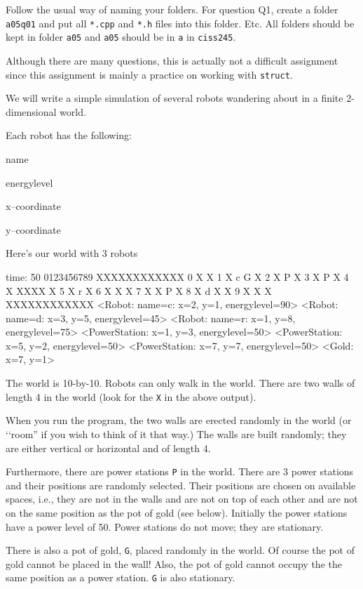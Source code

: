 
Follow the usual way of naming your folders.
For question Q1, create a folder \verb!a05q01! and put all 
\verb!*.cpp! and \verb!*.h! files into this folder.
Etc.
All folders should be kept in folder \verb!a05! and \verb!a05! should be
in \verb!a! in \verb!ciss245!.

Although there are many questions,
this is actually not a difficult assignment since this assignment is
mainly a practice on working with \texttt{struct}.

\newpage

We will write a simple simulation of several robots wandering about in a
finite 2-dimensional world.

Each robot has the following:
\begin{tightlist}
\item name
\item energylevel
\item x--coordinate
\item y--coordinate
\end{tightlist}
Here's our world with 3 robots
\begin{console}
time: 50
   0123456789
  XXXXXXXXXXXX
0 X          X
1 X  c    G  X
2 X     P    X
3 X P        X
4 X   XXXX   X
5 X   r      X
6 X   X      X
7 X   X   P  X
8 X d X      X
9 X   X      X
  XXXXXXXXXXXX
<Robot: name=c: x=2, y=1, energylevel=90>
<Robot: name=d: x=3, y=5, energylevel=45>
<Robot: name=r: x=1, y=8, energylevel=75>
<PowerStation: x=1, y=3, energylevel=50>
<PowerStation: x=5, y=2, energylevel=50>
<PowerStation: x=7, y=7, energylevel=50>
<Gold: x=7, y=1>
\end{console}
The world is 10-by-10.
Robots can only walk in the world.
There are two walls of length 4 in the world (look for the
\verb!X! in the above output).

When you run the program,
the two walls are erected randomly in the world (or \lq\lq room'' if you
wish to think of it that way.)
The walls are built randomly; they are either vertical or 
horizontal and of length 4.

Furthermore, there are power stations \verb!P! in the world.
There are 3 power stations and their positions are randomly selected.
Their positions are chosen on available spaces, i.e., they
are not in the walls and are not on top of each other and are not
on the same position as the pot of gold (see below).
Initially the power stations have a power level of 50.
Power stations do not move; they are stationary.

There is also a pot of gold, \verb!G!, placed randomly in the world.
Of course the pot of gold cannot be placed in the wall!
Also, the pot of gold cannot occupy the the same position as a power station.
\verb!G! is also stationary.

